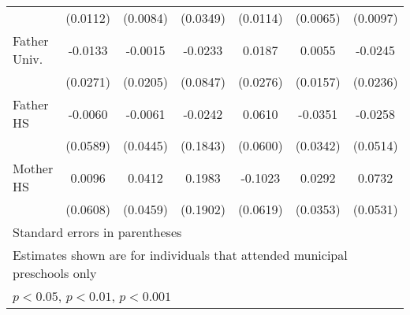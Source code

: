 \begin{table}[htbp]
\begin{tabular}{l*{6}{c}}
            &    (0.0112)         &    (0.0084)         &    (0.0349)         &    (0.0114)         &    (0.0065)         &    (0.0097)         \\
\addlinespace
Father Univ.&     -0.0133         &     -0.0015         &     -0.0233         &      0.0187         &      0.0055         &     -0.0245         \\
            &    (0.0271)         &    (0.0205)         &    (0.0847)         &    (0.0276)         &    (0.0157)         &    (0.0236)         \\
\addlinespace
Father HS   &     -0.0060         &     -0.0061         &     -0.0242         &      0.0610         &     -0.0351         &     -0.0258         \\
            &    (0.0589)         &    (0.0445)         &    (0.1843)         &    (0.0600)         &    (0.0342)         &    (0.0514)         \\
\addlinespace
Mother HS   &      0.0096         &      0.0412         &      0.1983         &     -0.1023         &      0.0292         &      0.0732         \\
            &    (0.0608)         &    (0.0459)         &    (0.1902)         &    (0.0619)         &    (0.0353)         &    (0.0531)         \\
\bottomrule
\multicolumn{7}{l}{\footnotesize Standard errors in parentheses}\\
\multicolumn{7}{l}{\footnotesize Estimates shown are for individuals that attended municipal preschools only}\\
\multicolumn{7}{l}{\footnotesize \sym{*} \(p<0.05\), \sym{**} \(p<0.01\), \sym{***} \(p<0.001\)}\\
\end{tabular}
\end{table}
